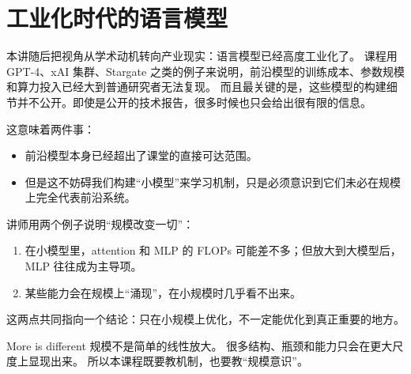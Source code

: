 \section{工业化时代的语言模型}

本讲随后把视角从学术动机转向产业现实：语言模型已经高度工业化了。
课程用 GPT-4、xAI 集群、Stargate 之类的例子来说明，前沿模型的训练成本、参数规模和算力投入已经大到普通研究者无法复现。
而且最关键的是，这些模型的构建细节并不公开。即使是公开的技术报告，很多时候也只会给出很有限的信息。

这意味着两件事：
\begin{itemize}
    \item 前沿模型本身已经超出了课堂的直接可达范围。
    \item 但是这不妨碍我们构建“小模型”来学习机制，只是必须意识到它们未必在规模上完全代表前沿系统。
\end{itemize}

讲师用两个例子说明“规模改变一切”：
\begin{enumerate}
    \item 在小模型里，attention 和 MLP 的 FLOPs 可能差不多；但放大到大模型后，MLP 往往成为主导项。
    \item 某些能力会在规模上“涌现”，在小规模时几乎看不出来。
\end{enumerate}

这两点共同指向一个结论：只在小规模上优化，不一定能优化到真正重要的地方。

\begin{warningbox}{More is different}
规模不是简单的线性放大。
很多结构、瓶颈和能力只会在更大尺度上显现出来。
所以本课程既要教机制，也要教“规模意识”。
\end{warningbox}

